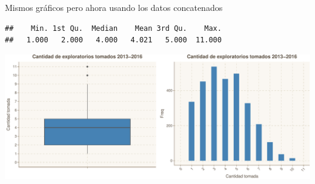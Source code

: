 \documentclass[]{article}
\begin{document}
\newline

Mismos gráficos pero ahora usando los datos concatenados

\begin{verbatim}
##    Min. 1st Qu.  Median    Mean 3rd Qu.    Max. 
##   1.000   2.000   4.000   4.021   5.000  11.000
\end{verbatim}

\begin{center}\includegraphics{Figs/unnamed-chunk-2-1} \end{center}
\end{document}
